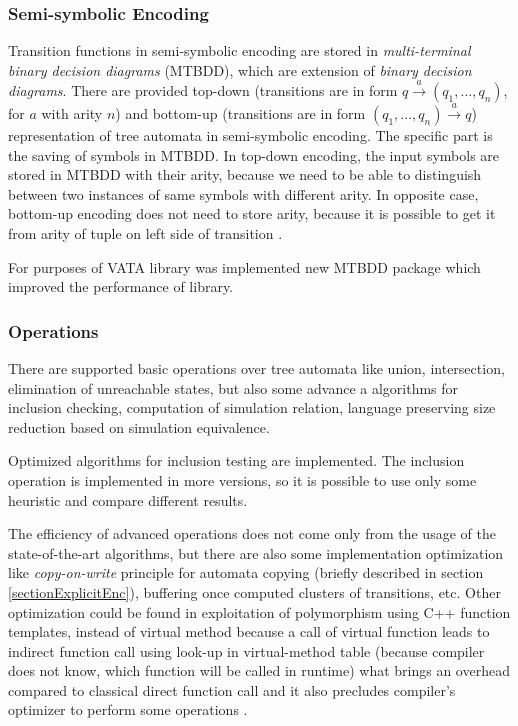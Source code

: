 \subsubsection{Semi-symbolic Encoding}
Transition functions in semi-symbolic encoding are stored in \emph{multi-terminal binary decision diagrams} (MTBDD), which are extension of \emph{binary decision 
diagrams}. There are provided top-down (transitions are in form $q \xrightarrow{a} (q_1,...,q_n)$, for $a$ with arity $n$) 
and bottom-up (transitions are in form $(q_1,...,q_n)\xrightarrow{a}q$) representation of tree automata in semi-symbolic encoding. 
The specific part is the saving of symbols in MTBDD. In top-down encoding, the input
symbols are stored in MTBDD with their arity, because we need to be able to distinguish between two instances of same symbols with different arity.
In opposite case, bottom-up encoding does not need to store arity, because it is possible to get it from arity of tuple on left side of transition \cite{libvata}.

For purposes of VATA library was implemented new MTBDD package which improved the performance of library.


\subsubsection{Operations}
There are supported basic operations over tree automata 
like union, intersection, elimination of unreachable states, but also some advance a algorithms for inclusion checking, 
computation of simulation relation, language preserving size reduction based on simulation equivalence. 

Optimized algorithms for inclusion testing \cite{cav06,tacas10} are implemented. The inclusion operation is implemented in more versions, so it is possible
to use only some heuristic and compare different results.

The efficiency of advanced operations does not come only from the usage of the state-of-the-art algorithms, 
but there are also some implementation optimization like \emph{copy-on-write}
principle for automata copying (briefly described in section \ref{sectionExplicitEnc}), buffering once computed clusters of transitions, etc. 
Other optimization could be found in exploitation of polymorphism using C++ function templates, instead of
virtual method because a call of virtual function leads to indirect function call using look-up in virtual-method table (because compiler does not know, which 
function will be called in runtime) what brings an overhead compared to classical direct 
function call and it also precludes compiler's optimizer to perform some operations \cite{libvata}. 

